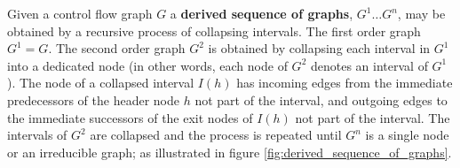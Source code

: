 
Given a control flow graph $G$ a \textbf{derived sequence of graphs}, $G^1 \dots G^n$, may be obtained by a recursive process of collapsing intervals. The first order graph $G^1 = G$. The second order graph $G^2$ is obtained by collapsing each interval in $G^1$ into a dedicated node (in other words, each node of $G^2$ denotes an interval of $G^1$). The node of a collapsed interval $I(h)$ has incoming edges from the immediate predecessors of the header node $h$ not part of the interval, and outgoing edges to the immediate successors of the exit nodes of $I(h)$ not part of the interval. The intervals of $G^2$ are collapsed and the process is repeated until $G^n$ is a single node or an irreducible graph; as illustrated in figure \ref{fig:derived_sequence_of_graphs}.

